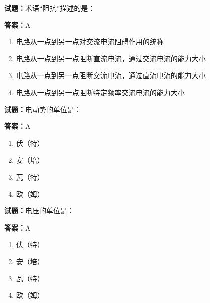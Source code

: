 \documentclass{ctexbook}
\begin{document}




\vspace{1em}

\textbf{试题：}术语“阻抗”描述的是： 

\textbf{答案：}A 

\begin{enumerate}[leftmargin=3em]
  \item 电路从一点到另一点对交流电流阻碍作用的统称 

  \item 电路从一点到另一点阻断直流电流，通过交流电流的能力大小 

  \item 电路从一点到另一点阻断交流电流，通过直流电流的能力大小 

  \item 电路从一点到另一点阻断特定频率交流电流的能力大小 

\end{enumerate}






\vspace{1em}

\textbf{试题：}电动势的单位是： 

\textbf{答案：}A 

\begin{enumerate}[leftmargin=3em]
  \item 伏（特） 

  \item 安（培） 

  \item 瓦（特） 

  \item 欧（姆） 

\end{enumerate}





\vspace{1em}

\textbf{试题：}电压的单位是： 

\textbf{答案：}A 

\begin{enumerate}[leftmargin=3em]
  \item 伏（特） 

  \item 安（培） 

  \item 瓦（特） 

  \item 欧（姆） 

\end{enumerate}
\end{document}
